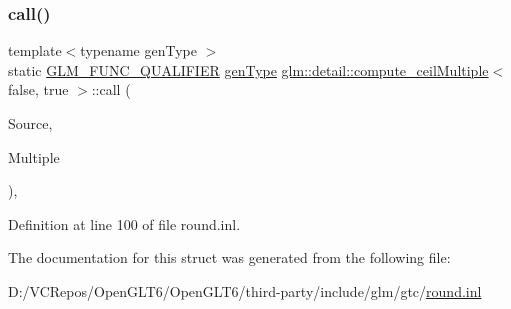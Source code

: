 \subsubsection{\texorpdfstring{call()}{call()}}
{\footnotesize\ttfamily template$<$typename gen\+Type $>$ \\
static \mbox{\hyperlink{setup_8hpp_a33fdea6f91c5f834105f7415e2a64407}{G\+L\+M\+\_\+\+F\+U\+N\+C\+\_\+\+Q\+U\+A\+L\+I\+F\+I\+ER}} \mbox{\hyperlink{structglm_1_1detail_1_1gen_type}{gen\+Type}} \mbox{\hyperlink{structglm_1_1detail_1_1compute__ceil_multiple}{glm\+::detail\+::compute\+\_\+ceil\+Multiple}}$<$ false, true $>$\+::call (\begin{DoxyParamCaption}\item[{\mbox{\hyperlink{structglm_1_1detail_1_1gen_type}{gen\+Type}}}]{Source,  }\item[{\mbox{\hyperlink{structglm_1_1detail_1_1gen_type}{gen\+Type}}}]{Multiple }\end{DoxyParamCaption})\hspace{0.3cm}{\ttfamily [inline]}, {\ttfamily [static]}}



Definition at line 100 of file round.\+inl.



The documentation for this struct was generated from the following file\+:\begin{DoxyCompactItemize}
\item 
D\+:/\+V\+C\+Repos/\+Open\+G\+L\+T6/\+Open\+G\+L\+T6/third-\/party/include/glm/gtc/\mbox{\hyperlink{round_8inl}{round.\+inl}}\end{DoxyCompactItemize}

